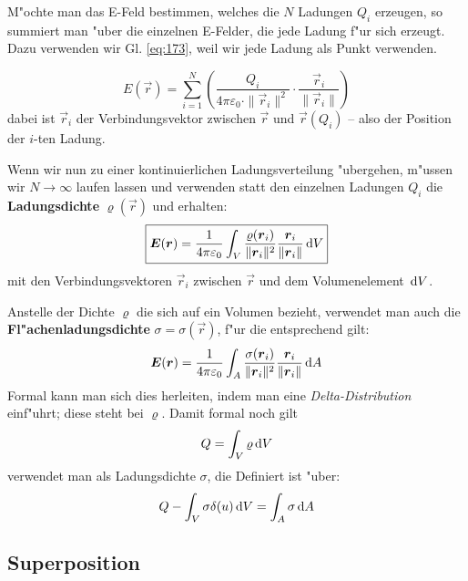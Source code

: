 M"ochte man das E-Feld bestimmen, welches die $N$ Ladungen $Q_i$
erzeugen, so summiert man "uber die einzelnen E-Felder, die jede Ladung
f"ur sich erzeugt. Dazu verwenden wir Gl. \eqref{eq:173}, weil wir jede
Ladung als Punkt verwenden.

\begin{equation}
   \label{eq:174}
   E(\vec r) = \sum_{i = 1}^N \left (\frac{Q_i}{4\pi\varepsilon_0 \cdot
     \|\vec r_i\|^2} \cdot \frac{\vec r_i}{\|\vec r_i\|} \right )
\end{equation}
dabei ist $\vec r_i$ der Verbindungsvektor zwischen $\vec r$ und $\vec
r(Q_i)$ -- also der Position der $i$-ten Ladung.

Wenn wir nun zu einer kontinuierlichen Ladungsverteilung "ubergehen,
m"ussen wir $N \to \infty$ laufen lassen und verwenden statt den
einzelnen Ladungen $Q_i$ die
\textbf{Ladungsdichte} $\varrho(\vec r)$ und
erhalten:
\begin{equation}
   \label{eq:175}
\boxed{
   \boldsymbol{E}(\boldsymbol{r}) = \frac{1}{4\pi\varepsilon_0} \int_V
   \frac{\varrho(\boldsymbol{r}_i)}{\|\boldsymbol{r}_i\|^2} \frac{\boldsymbol{r}_i}{\|\boldsymbol{r}_i\|} \, \mathrm{d} V
}
\end{equation}
mit den Verbindungsvektoren $\vec r_i$ zwischen $\vec r$ und dem
Volumenelement $\, \mathrm{d} V$.

Anstelle der Dichte $\varrho$ die sich auf ein Volumen bezieht,
verwendet man auch die
\textbf{Fl"achenladungsdichte} $\sigma =
\sigma(\vec r)$, f"ur die entsprechend gilt:
\begin{equation}
   \label{eq:176}
      \boldsymbol{E}(\boldsymbol{r}) = \frac{1}{4\pi\varepsilon_0} \int_A
   \frac{\sigma(\boldsymbol{r}_i)}{\|\boldsymbol{r}_i\|^2} \frac{\boldsymbol{r}_i}{\|\boldsymbol{r}_i\|} \, \mathrm{d} A
\end{equation}
Formal kann man sich dies herleiten, indem man eine
\emph{Delta-Distribution} einf"uhrt; diese steht bei $\varrho$. Damit
formal noch gilt
\begin{equation*}
   Q = \int_V \varrho \, \mathrm{d} V
\end{equation*}
verwendet man als Ladungsdichte $\sigma$, die Definiert ist "uber:
\begin{equation*}
   Q - \int_V \sigma \delta(u) \, \mathrm{d} V = \int_A \sigma \, \mathrm{d} A
\end{equation*}




\subsection{Superposition}
\label{kap_superposition}

